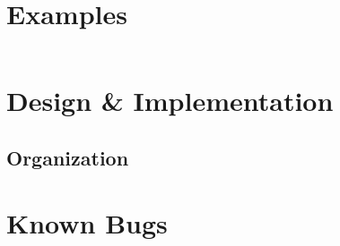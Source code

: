 \documentclass[paper=a4, fontsize=11pt]{scrartcl}
\begin{document}
\section*{Examples}
\begin{lstlisting}[style=ShellStyle]
\end{lstlisting}

\section*{Design \& Implementation}
\subsection*{Organization}




\section*{Known Bugs}
\end{document}
